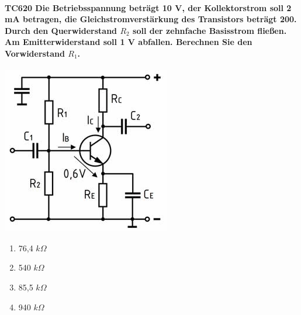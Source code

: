 \documentclass[8pt]{article}
\begin{document}
\begin{enumerate}
\begin{enumerate}[nolistsep,label=\Alph*]
{\begin{enumerate}[nolistsep,label=\Alph*]
\paragraph*{TC620 Die Betriebsspannung beträgt 10 V, der Kollektorstrom soll 2 mA betragen, die Gleichstromverstärkung des Transistors beträgt 200. Durch den Querwiderstand $R_{2}$ soll der zehnfache Basisstrom fließen. Am Emitterwiderstand soll 1 V abfallen. Berechnen Sie den Vorwiderstand $R_{1}$.}
\begin{center}
	\begin{minipage}{\linewidth}
		\centering
		\includegraphics[scale=1.0]{pics/tc620_a.jpg}
	\end{minipage}
\end{center}
\begin{enumerate}[nolistsep,label=\Alph*]
\item 76,4 $k\Omega$
\item 540 $k\Omega$
\item 85,5 $k\Omega$
\item 940 $k\Omega$
\end{enumerate}


\end{enumerate}}
\end{enumerate}
\end{enumerate}
\end{document}
